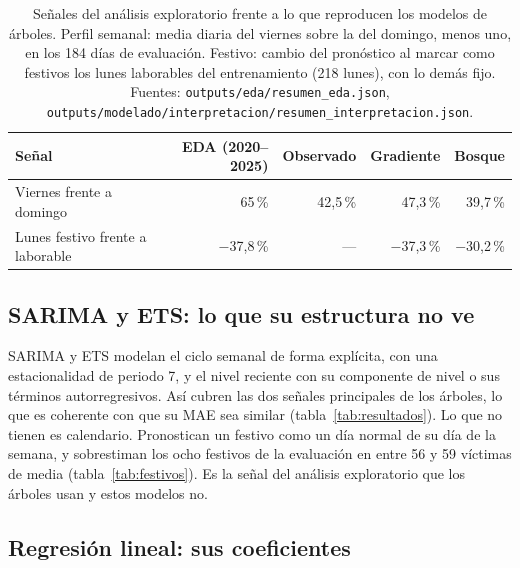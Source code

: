 \begin{table}[H]
\centering
\caption{Señales del análisis exploratorio frente a lo que reproducen los modelos de árboles. Perfil semanal: media diaria del viernes sobre la del domingo, menos uno, en los 184 días de evaluación. Festivo: cambio del pronóstico al marcar como festivos los lunes laborables del entrenamiento (218 lunes), con lo demás fijo. Fuentes: \texttt{outputs/\allowbreak{}eda/\allowbreak{}resumen\_\allowbreak{}eda.json}, \texttt{outputs/\allowbreak{}modelado/\allowbreak{}interpretacion/\allowbreak{}resumen\_\allowbreak{}interpretacion.json}.}\label{tab:contraste-eda}
\small
\begin{tabular}{@{}lrrrr@{}}
\toprule
\textbf{Señal} & \textbf{EDA (2020--2025)} & \textbf{Observado} & \textbf{Gradiente} & \textbf{Bosque} \\
\midrule
Viernes frente a domingo & 65\,\% & 42,5\,\% & 47,3\,\% & 39,7\,\% \\
Lunes festivo frente a laborable & $-$37,8\,\% & --- & $-$37,3\,\% & $-$30,2\,\% \\
\bottomrule
\end{tabular}
\end{table}

\subsection{SARIMA y ETS: lo que su estructura no ve}\label{sec:int-series}

SARIMA y ETS modelan el ciclo semanal de forma explícita, con una estacionalidad de periodo 7, y el nivel reciente con su componente de nivel o sus términos autorregresivos. Así cubren las dos señales principales de los árboles, lo que es coherente con que su MAE sea similar (tabla~\ref{tab:resultados}). Lo que no tienen es calendario. Pronostican un festivo como un día normal de su día de la semana, y sobrestiman los ocho festivos de la evaluación en entre 56 y 59 víctimas de media (tabla~\ref{tab:festivos}). Es la señal del análisis exploratorio que los árboles usan y estos modelos no.

\subsection{Regresión lineal: sus coeficientes}\label{sec:int-regresion}

